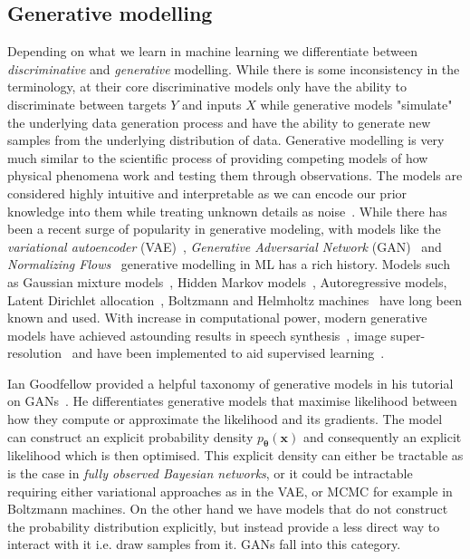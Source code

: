 \documentclass[final,3p,times,twocolumn]{elsarticle}
\begin{document}
\subsection{Generative modelling}
Depending on what we learn in machine learning we differentiate between \emph{discriminative} and \emph{generative} modelling. While there is some inconsistency in the terminology, at their core discriminative models only have the ability to discriminate between targets $Y$ and inputs $X$ while generative models "simulate" the underlying data generation process and have the ability to generate new samples from the underlying distribution of data. Generative modelling is very much similar to the scientific process of providing competing models of how physical phenomena work and testing them through observations. The models are considered highly intuitive and interpretable as we can encode our prior knowledge into them while treating unknown details as noise~\cite{kingma2017variational}. While there has been a recent surge of popularity in generative modeling, with models like the \emph{variational autoencoder} (VAE)~\cite{kingma2013auto, rezende2014stochastic}, \emph{Generative Adversarial Network} (GAN)~\cite{goodfellow2016nips} and \emph{Normalizing Flows}~\cite{rezende2015variational} generative modelling in ML has a rich history. Models such as Gaussian mixture models~\cite{everitt2014finite}, Hidden Markov models~\cite{rabiner1986introduction}, Autoregressive models, Latent Dirichlet allocation~\cite{blei2003latent}, Boltzmann and Helmholtz machines~\cite{ackley1985learning, dayan1995helmholtz} have long been known and used. With increase in computational power, modern generative models have achieved astounding results in speech synthesis~\cite{oord2016wavenet}, image super-resolution~\cite{ledig2017photo} and have been implemented to aid supervised learning~\cite{kingma2014semi}. 

Ian Goodfellow provided a helpful taxonomy of generative models in his tutorial on GANs~\cite{goodfellow2016nips}. He differentiates generative models that maximise likelihood between how they compute or approximate the likelihood and its gradients. The model can construct an explicit probability density $p_{\boldsymbol{\theta}}(\mathbf{x})$ and consequently an explicit likelihood which is then optimised. This explicit density can either be tractable as is the case in \emph{fully observed Bayesian networks}, or it could be intractable requiring either variational approaches as in the VAE, or MCMC for example in Boltzmann machines. On the other hand we have models that do not construct the probability distribution explicitly, but instead provide a less direct way to interact with it i.e. draw samples from it. GANs fall into this category. 
\end{document}
